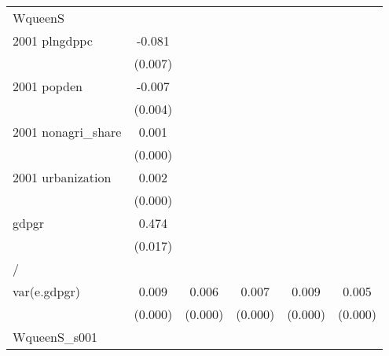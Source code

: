 \begin{table}[htbp]
\begin{tabular}{l*{5}{c}}
\hline
WqueenS             &                     &                     &                     &                     &                     \\
2001 plngdppc       &      -0.081\sym{***}&                     &                     &                     &                     \\
                    &     (0.007)         &                     &                     &                     &                     \\
2001 popden         &      -0.007\sym{**} &                     &                     &                     &                     \\
                    &     (0.004)         &                     &                     &                     &                     \\
2001 nonagri\_share  &       0.001\sym{***}&                     &                     &                     &                     \\
                    &     (0.000)         &                     &                     &                     &                     \\
2001 urbanization   &       0.002\sym{***}&                     &                     &                     &                     \\
                    &     (0.000)         &                     &                     &                     &                     \\
gdpgr               &       0.474\sym{***}&                     &                     &                     &                     \\
                    &     (0.017)         &                     &                     &                     &                     \\
\hline
/                   &                     &                     &                     &                     &                     \\
var(e.gdpgr)        &       0.009\sym{***}&       0.006\sym{***}&       0.007\sym{***}&       0.009\sym{***}&       0.005\sym{***}\\
                    &     (0.000)         &     (0.000)         &     (0.000)         &     (0.000)         &     (0.000)         \\
\hline
WqueenS\_s001        &                     &                     &                     &                     &                     \\

\end{tabular}
\end{table}
